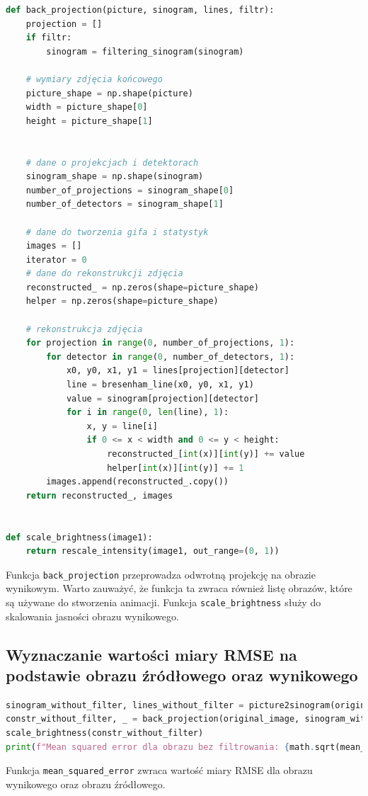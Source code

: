 \documentclass[11pt,a4paper]{article}
\begin{document}
\begin{lstlisting}[language=Python, basicstyle=\normal, breaklines=true]
def back_projection(picture, sinogram, lines, filtr):
    projection = []
    if filtr:
        sinogram = filtering_sinogram(sinogram)

    # wymiary zdjęcia końcowego
    picture_shape = np.shape(picture)
    width = picture_shape[0]
    height = picture_shape[1]


    # dane o projekcjach i detektorach
    sinogram_shape = np.shape(sinogram)
    number_of_projections = sinogram_shape[0]
    number_of_detectors = sinogram_shape[1]

    # dane do tworzenia gifa i statystyk
    images = []
    iterator = 0
    # dane do rekonstrukcji zdjęcia
    reconstructed_ = np.zeros(shape=picture_shape)
    helper = np.zeros(shape=picture_shape)

    # rekonstrukcja zdjęcia
    for projection in range(0, number_of_projections, 1):
        for detector in range(0, number_of_detectors, 1):
            x0, y0, x1, y1 = lines[projection][detector]
            line = bresenham_line(x0, y0, x1, y1)
            value = sinogram[projection][detector]
            for i in range(0, len(line), 1):
                x, y = line[i]
                if 0 <= x < width and 0 <= y < height:
                    reconstructed_[int(x)][int(y)] += value
                    helper[int(x)][int(y)] += 1
        images.append(reconstructed_.copy())
    return reconstructed_, images


def scale_brightness(image1):
    return rescale_intensity(image1, out_range=(0, 1))
\end{lstlisting}
    Funkcja \texttt{back\_projection} przeprowadza odwrotną projekcję na obrazie wynikowym.
    Warto zauważyć, że funkcja ta zwraca również listę obrazów, które są używane do stworzenia animacji. Funkcja \texttt{scale\_brightness} służy do skalowania jasności obrazu wynikowego.
    \subsection{Wyznaczanie wartości miary RMSE na podstawie obrazu źródłowego oraz wynikowego}\label{sec:wyznaczanie-wartosci-miary-rmse-na-podstawie-obrazu-zrodowego-oraz-wynikowego}
    \begin{lstlisting}[language=Python, basicstyle=\normal, breaklines=true]
sinogram_without_filter, lines_without_filter = picture2sinogram(original_image, width, detector_amount, alpha)
constr_without_filter, _ = back_projection(original_image, sinogram_without_filter, lines_without_filter, False)
scale_brightness(constr_without_filter)
print(f"Mean squared error dla obrazu bez filtrowania: {math.sqrt(mean_squared_error(original_image, constr_without_filter))}")
\end{lstlisting}
    Funkcja \texttt{mean\_squared\_error} zwraca wartość miary RMSE dla obrazu wynikowego oraz obrazu źródłowego.
\end{document}
